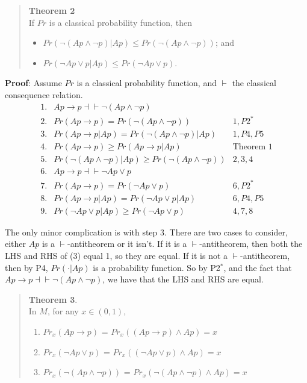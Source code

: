 \documentclass[
  11pt,
  letterpaper,
  DIV=11,
  numbers=noendperiod,
  oneside]{scrartcl}
\providecommand{\tightlist}{%
  \setlength{\itemsep}{0pt}\setlength{\parskip}{0pt}}\usepackage{longtable,booktabs,array}
\begin{document}
\begin{quote}
\textbf{Theorem 2}\\
If \(Pr\) is a classical probability function, then

\begin{itemize}
\tightlist
\item
  \(Pr(\neg(Ap \wedge \neg p) | Ap) \leq Pr(\neg(Ap \wedge \neg p))\);
  and
\item
  \(Pr(\neg Ap \vee p | Ap) \leq Pr(\neg Ap \vee p)\).
\end{itemize}
\end{quote}

\textbf{Proof}: Assume \(Pr\) is a classical probability function, and
\(\vdash\) the classical consequence relation. \[\begin{aligned}
1. &Ap \rightarrow p \dashv  \vdash \neg(Ap \wedge \neg p) &  \\
2. &Pr(Ap \rightarrow p) = Pr(\neg(Ap \wedge \neg p)) & 1, P2^* \\
3. &Pr(Ap \rightarrow p | Ap) = Pr(\neg(Ap \wedge \neg p) | Ap) & 1, P4, P5 \\
4. &Pr(Ap \rightarrow p ) \geq Pr (Ap \rightarrow p|Ap) & \text{Theorem 1} \\
5. &Pr(\neg(Ap \wedge \neg p) | Ap) \geq Pr(\neg(Ap \wedge \neg p)) & 2, 3, 4 \\
6. &Ap \rightarrow p \dashv  \vdash \neg Ap \vee p &  \\
7. &Pr(Ap \rightarrow p) = Pr(\neg Ap \vee p) & 6, P2^* \\
8. &Pr(Ap \rightarrow p | Ap) = Pr(\neg Ap \vee p | Ap) & 6, P4, P5 \\
9. &Pr(\neg Ap \vee p | Ap) \geq Pr(\neg Ap \vee p) & 4, 7, 8\end{aligned}\]

The only minor complication is with step 3. There are two cases to
consider, either \(Ap\) is a \(\vdash\)-antitheorem or it isn't. If it
is a \(\vdash\)-antitheorem, then both the LHS and RHS of (3) equal 1,
so they are equal. If it is not a \(\vdash\)-antitheorem, then by P4,
\(Pr(\cdot | Ap)\) is a probability function. So by P2\(^*\), and the
fact that \(Ap \rightarrow p \dashv \vdash \neg(Ap \wedge \neg p)\), we
have that the LHS and RHS are equal.

\begin{quote}
\textbf{Theorem 3}.\\
In \(M\), for any \(x \in (0, 1)\),

\begin{enumerate}
\def\labelenumi{\arabic{enumi}.}
\tightlist
\item
  \(Pr_x(Ap \rightarrow p)\) =
  \(Pr_x((Ap \rightarrow p) \wedge Ap) = x\)
\item
  \(Pr_x(\neg Ap \vee p)\) = \(Pr_x((\neg Ap \vee p) \wedge Ap) = x\)
\item
  \(Pr_x(\neg(Ap \wedge \neg p))\) =
  \(Pr_x(\neg(Ap \wedge \neg p) \wedge Ap) = x\)
\end{enumerate}
\end{quote}
\end{document}
